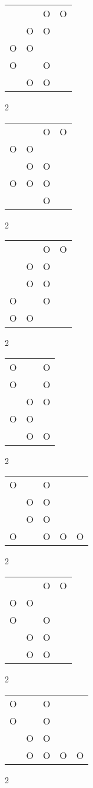 \begin{tabular}{|m{0.2cm}m{0.2cm}m{0.2cm}m{0.2cm}|}\hline
 & &O&O\\
 &O&O& \\
O&O& & \\
O& &O& \\
 &O&O& \\
\hline\end{tabular}2
\begin{tabular}{|m{0.2cm}m{0.2cm}m{0.2cm}m{0.2cm}|}\hline
 & &O&O\\
O&O& & \\
 &O&O& \\
O&O&O& \\
 & &O& \\
\hline\end{tabular}2
\begin{tabular}{|m{0.2cm}m{0.2cm}m{0.2cm}m{0.2cm}|}\hline
 & &O&O\\
 &O&O& \\
 &O&O& \\
O& &O& \\
O&O& & \\
\hline\end{tabular}2
\begin{tabular}{|m{0.2cm}m{0.2cm}m{0.2cm}|}\hline
O& &O\\
O& &O\\
 &O&O\\
O&O& \\
 &O&O\\
\hline\end{tabular}2
\begin{tabular}{|m{0.2cm}m{0.2cm}m{0.2cm}m{0.2cm}m{0.2cm}|}\hline
O& &O& & \\
 &O&O& & \\
 &O&O& & \\
O& &O&O&O\\
\hline\end{tabular}2
\begin{tabular}{|m{0.2cm}m{0.2cm}m{0.2cm}m{0.2cm}|}\hline
 & &O&O\\
O&O& & \\
O& &O& \\
 &O&O& \\
 &O&O& \\
\hline\end{tabular}2
\begin{tabular}{|m{0.2cm}m{0.2cm}m{0.2cm}m{0.2cm}m{0.2cm}|}\hline
O& &O& & \\
O& &O& & \\
 &O&O& & \\
 &O&O&O&O\\
\hline\end{tabular}2
